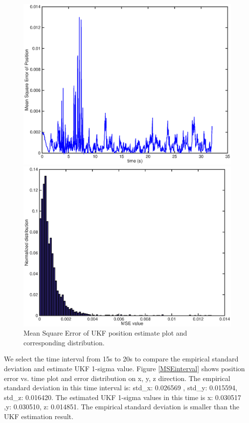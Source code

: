 \documentclass[letter, 10pt]{article}
\begin{document}
\begin{onehalfspacing}
\begin{figure}[h]
	\centering
	\begin{minipage}{.5\textwidth} 
  		\centering
    		\includegraphics[width=0.8\linewidth]{MSE.eps}
	\end{minipage}%
	\begin{minipage}{.5\textwidth} 
		\centering
    		\includegraphics[width=0.8\linewidth]{MSE_dist.eps}
	\end{minipage}
	\centering
	\caption{Mean Square Error of UKF position estimate plot and corresponding distribution.}
	\label{MSE}	
\end{figure}

We select the time interval from 15s to 20s to compare the empirical standard deviation and estimate UKF 1-sigma value. Figure \ref{MSEinterval} shows position error vs. time plot and error distribution on x, y, z direction. The empirical standard deviation in this time interval is: std\_x: 0.026569 , std\_y: 0.015594, std\_z: 0.016420. The estimated UKF 1-sigma values in this time is x: 0.030517 ,y: 0.030510, z: 0.014851. The empirical standard deviation is smaller than the UKF estimation result. 


\end{onehalfspacing}
\end{document}
